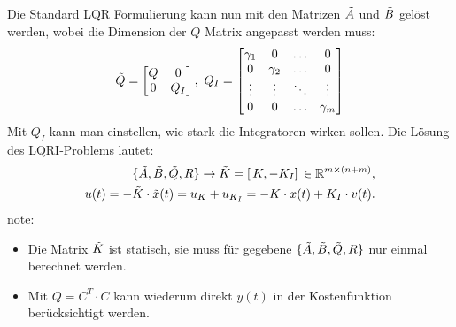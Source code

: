 Die Standard LQR Formulierung kann nun mit den Matrizen $\Tilde{A}$ und $\Tilde{B}$ gelöst werden, wobei die Dimension der $Q$ Matrix angepasst werden muss:
\[\Tilde{Q} =\begin{bmatrix} Q & 0 \\ 0 & Q_I\end{bmatrix},\ Q_I = \begin{bmatrix}
    \gamma_1 & 0 & \dots & 0 \\
    0 & \gamma_2 & \dots & 0\\
    \vdots & \vdots &\ddots &   \vdots\\
    0 & 0 & \dots &\gamma_m
\end{bmatrix}\]
Mit $Q_I$ kann man einstellen, wie stark die Integratoren wirken sollen. Die Lösung des LQRI-Problems lautet:
\begin{align*}
    \{\Tilde{A},\Tilde{B},\Tilde{Q},R\}\rightarrow \Tilde{K}=[\,K, - K_I]\, \in \mathbb{R}^{m\times(n+m)},\\
    u(t) = -\Tilde{K}\cdot\Tilde{x}(t) = u_K + u_{K_I} = -K\cdot x(t) + K_I\cdot v(t).
\end{align*}
note: \begin{itemize}
    \item Die Matrix $\Tilde{K}$ ist statisch, sie muss für gegebene $\{\Tilde{A},\Tilde{B},\Tilde{Q},R\}$ nur einmal berechnet werden.
    \item Mit $Q = C^T \cdot C$ kann wiederum direkt $y(t)$ in der Kostenfunktion berücksichtigt werden. 
\end{itemize}